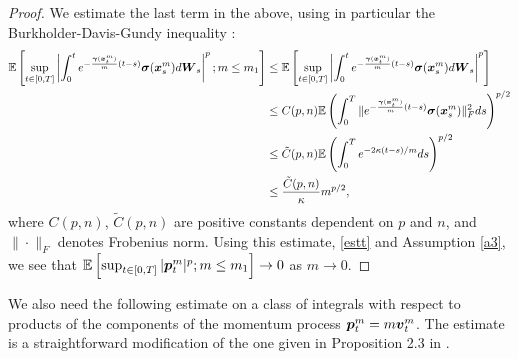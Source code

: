 \begin{proof}
We estimate the last term in the above, using in particular the Burkholder-Davis-Gundy inequality \cite{karatzas2012Brownian}:
\begin{align}
\mathbb{E} \left[  \sup_{t \in [0,T]} \left| \int_0^t e^{-\frac{\boldsymbol{\gamma}(\boldsymbol{x}_t^m)}{m}(t-s)} \boldsymbol{\sigma}(\boldsymbol{x}_s^m) d\boldsymbol{W}_s \right|^p; m \leq m_1 \right] &\leq \mathbb{E} \left[  \sup_{t \in [0,T]} \left| \int_0^t e^{-\frac{\boldsymbol{\gamma}(\boldsymbol{x}_t^m)}{m}(t-s)} \boldsymbol{\sigma}(\boldsymbol{x}_s^m) d\boldsymbol{W}_s \right|^p\right]  \\ 
&\leq C(p,n) \mathbb{E}  \left(\int_0^T \|  e^{-\frac{\boldsymbol{\gamma}(\boldsymbol{x}_t^m)}{m}(t-s)} \boldsymbol{\sigma}(\boldsymbol{x}_s^m) \|_{F}^2 ds \right)^{p/2} \\ 
&\leq \tilde{C}(p,n) \mathbb{E} \left(\int_0^T  e^{-2\kappa(t-s)/m} ds \right)^{p/2} \\
&\leq \frac{\tilde{C}(p,n)}{\kappa} m^{p/2}, 
\end{align}
where $C(p,n)$, $\tilde{C}(p,n)$ are positive constants dependent on $p$ and $n$, and $\|\cdot \|_F$ denotes Frobenius norm. 
Using this estimate, \eqref{estt} and Assumption \ref{a3}, we see that  $\mathbb{E}\left[\sup_{t \in [0,T]} |\boldsymbol{p}_t^m|^p; m \leq m_1 \right] \to 0$ as $m \to 0$. 
\end{proof}







We also need the following estimate on a class of integrals with respect to products of the components of the momentum process $\boldsymbol{p}^m_{t} = m\boldsymbol{v}^m_{t}$. The estimate is a straightforward modification  of the one given in Proposition 2.3 in \cite{birrell2017homogenization}.

